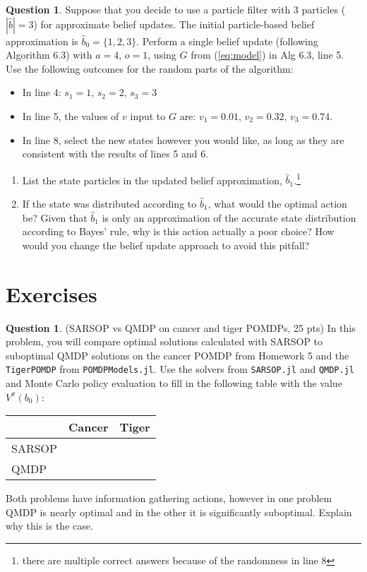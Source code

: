 \documentclass{article}
\theoremstyle{definition}
\newtheorem{question}[thm]{Question}
\begin{document}
\begin{question}
Suppose that you decide to use a particle filter with 3 particles ($|\hat{b}|=3$) for approximate belief updates. The initial particle-based belief approximation is $\hat{b}_0 = \{1, 2, 3\}$. Perform a single belief update (following Algorithm 6.3) with $a=4$, $o=1$, using $G$ from (\ref{eq:model}) in Alg 6.3, line 5. Use the following outcomes for the random parts of the algorithm:
\begin{itemize}[noitemsep]
    \item In line 4: $s_1 = 1$, $s_2 = 2$, $s_3 = 3$
    \item In line 5, the values of $v$ input to $G$ are: $v_1 = 0.01$, $v_2 = 0.32$, $v_3=0.74$.
    \item In line 8, select the new states however you would like, as long as they are consistent with the results of lines 5 and 6.
\end{itemize}

\begin{enumerate}[label=(\alph*)]
    \item List the state particles in the updated belief approximation, $\hat{b}_1$.\footnote{there are multiple correct answers because of the randomness in line 8}
    \item If the state was distributed according to $\hat{b}_1$, what would the optimal action be? Given that $\hat{b}_1$ is only an approximation of the accurate state distribution according to Bayes' rule, why is this action actually a poor choice? How would you change the belief update approach to avoid this pitfall?
\end{enumerate}

\end{question}

\section{Exercises}

\begin{question}
    (SARSOP vs QMDP on cancer and tiger POMDPs, 25 pts) In this problem, you will compare optimal solutions calculated with SARSOP to suboptimal QMDP solutions on the cancer POMDP from Homework 5 and the \texttt{TigerPOMDP} from \texttt{POMDPModels.jl}. Use the solvers from \texttt{SARSOP.jl} and \texttt{QMDP.jl} and Monte Carlo policy evaluation to fill in the following table with the value $V^\pi(b_0)$:\\
    \begin{tabular}{l|c|c}
               & Cancer & Tiger \\
        \midrule
        SARSOP &        &       \\
        \midrule
        QMDP   &        &
    \end{tabular}

Both problems have information gathering actions, however in one problem QMDP is nearly optimal and in the other it is significantly suboptimal. Explain why this is the case.
\end{question}
\end{document}
